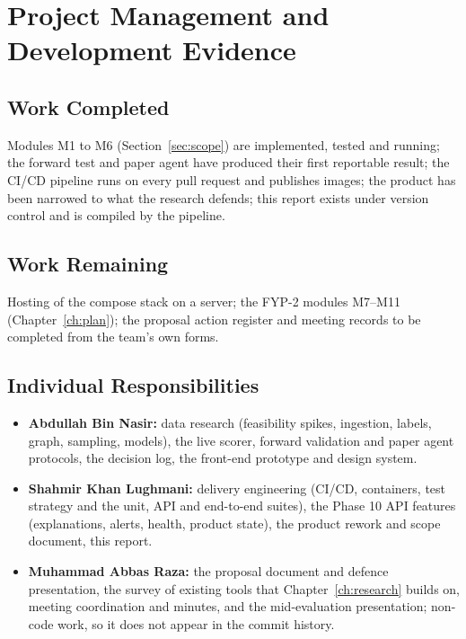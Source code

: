 \chapter{Project Management and Development Evidence}
\label{ch:pm}

\section{Work Completed}
Modules M1 to M6 (Section~\ref{sec:scope}) are implemented, tested and running; the forward test and paper agent have produced their first reportable result; the CI/CD pipeline runs on every pull request and publishes images; the product has been narrowed to what the research defends; this report exists under version control and is compiled by the pipeline.

\section{Work Remaining}
Hosting of the compose stack on a server; the FYP-2 modules M7--M11 (Chapter~\ref{ch:plan}); the proposal action register and meeting records to be completed from the team's own forms.

\section{Individual Responsibilities}
\begin{itemize}
  \item \textbf{Abdullah Bin Nasir:} data research (feasibility spikes, ingestion, labels, graph, sampling, models), the live scorer, forward validation and paper agent protocols, the decision log, the front-end prototype and design system.
  \item \textbf{Shahmir Khan Lughmani:} delivery engineering (CI/CD, containers, test strategy and the unit, API and end-to-end suites), the Phase 10 API features (explanations, alerts, health, product state), the product rework and scope document, this report.
  \item \textbf{Muhammad Abbas Raza:} the proposal document and defence presentation, the survey of existing tools that Chapter~\ref{ch:research} builds on, meeting coordination and minutes, and the mid-evaluation presentation; non-code work, so it does not appear in the commit history.
\end{itemize}

